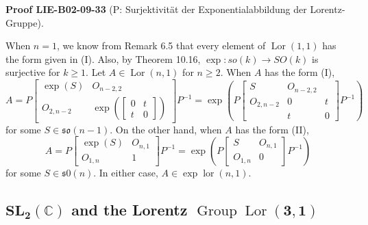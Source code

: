 \documentclass[10pt, letterpaper]{article}
\newcommand{\CustomHeading}[3]{%
  \par\medskip\noindent%
  \textbf{#1 #2} \textnormal{(#3)}.\enskip%
}
\newenvironment{PROOF}[2]{\begin{unitbox}\CustomHeading{Proof}{#1}{#2}}{\end{unitbox}}
\begin{document}
\begin{PROOF}{LIE-B02-09-33}{P: Surjektivität der Exponentialabbildung der Lorentz-Gruppe}
When $n=1$, we know from Remark 6.5 that every element of $\operatorname{Lor}(1,1)$ has the form given in (I). Also, by Theorem 10.16, $\exp : s o(k) \longrightarrow S O(k)$ is surjective for $k \geqslant 1$. Let $A \in \operatorname{Lor}(n, 1)$ for $n \geqslant 2$. When $A$ has the form (I),
$$
A=P\left[\begin{array}{cc}
\exp (S) & O_{n-2,2} \\
O_{2, n-2} & \exp \left(\left[\begin{array}{cc}
0 & t \\
t & 0
\end{array}\right]\right)
\end{array}\right] P^{-1}=\exp \left(P\left[\begin{array}{ccc}
S & O_{n-2,2} \\
O_{2, n-2} & 0 & t \\
& t & 0
\end{array}\right] P^{-1}\right)
$$
for some $S \in \mathfrak{s o}(n-1)$. On the other hand, when $A$ has the form (II),
$$
A=P\left[\begin{array}{cc}
\exp (S) & O_{n, 1} \\
O_{1, n} & 1
\end{array}\right] P^{-1}=\exp \left(P\left[\begin{array}{cc}
S & O_{n, 1} \\
O_{1, n} & 0
\end{array}\right] P^{-1}\right)
$$
for some $S \in \mathfrak{s} 0(n)$. In either case, $A \in \exp \operatorname{lor}(n, 1)$.
\end{PROOF}





\pagebreak





\subsection{$\mathbf{S L}_{\mathbf{2}}(\mathbb{C})$ and the Lorentz $\operatorname{Group} \operatorname{Lor}(\mathbf{3}, \mathbf{1})$}
\end{document}
